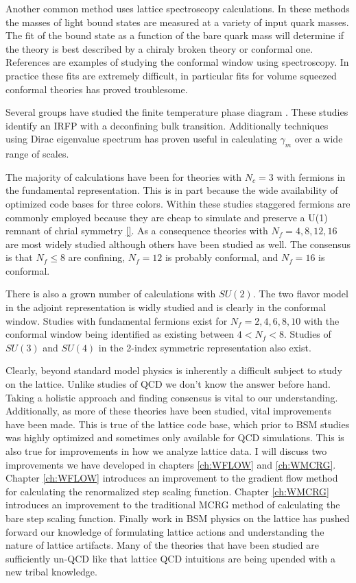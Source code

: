 Another common method uses lattice spectroscopy calculations.
In these methods the masses of light bound states are measured at a variety of input quark masses.
The fit of the bound state as a function of the bare quark mass will determine if the theory is best described by a chiraly broken theory or conformal one.
References \cite{125-127} are examples of studying the conformal window using spectroscopy.
In practice these fits are extremely difficult, in particular fits for volume squeezed conformal theories has proved troublesome.

Several groups have studied the finite temperature phase diagram \cite{131}.
These studies identify an IRFP with a deconfining bulk transition.
Additionally techniques using Dirac eigenvalue spectrum \cite{130} has proven useful in calculating $\gamma_m$ over a wide range of scales.

The majority of calculations have been for theories with $N_c=3$ with fermions in the fundamental representation.
This is in part because the wide availability of optimized code bases for three colors.
Within these studies staggered fermions are commonly employed because they are cheap to simulate and preserve a U(1) remnant of chrial symmetry \ref{}.
As a consequence theories with $N_f=4,8,12,16$ are most widely studied although others have been studied as well.
The consensus is that $N_f\le8$ are confining, $N_f=12$ is probably conformal, and $N_f=16$ is conformal.

There is also a grown number of calculations with $SU(2)$.
The two flavor model in the adjoint representation is widly studied and is clearly in the conformal window\cite{137-156}.
Studies with fundamental fermions exist for $N_f=2,4,6,8,10$ with the conformal window being identified as existing between $4<N_f<8$.
Studies of $SU(3)$ and $SU(4)$ in the 2-index symmetric representation also exist.

Clearly, beyond standard model physics is inherently a difficult subject to study on the lattice.
Unlike studies of QCD we don't know the answer before hand.
Taking a holistic approach and finding consensus is vital to our understanding.
Additionally, as more of these theories have been studied, vital improvements have been made.
This is true of the lattice code base, which prior to BSM studies was highly optimized and sometimes only available for QCD simulations.
This is also true for improvements in how we analyze lattice data.
I will discuss two improvements we have developed in chapters \ref{ch:WFLOW} and \ref{ch:WMCRG}.
Chapter \ref{ch:WFLOW} introduces an improvement to the gradient flow method for calculating the renormalized step scaling function.
Chapter \ref{ch:WMCRG} introduces an improvement to the traditional MCRG method of calculating the bare step scaling function.
Finally work in BSM physics on the lattice has pushed forward our knowledge of formulating lattice actions and understanding the nature of lattice artifacts.
Many of the theories that have been studied are sufficiently un-QCD like that lattice QCD intuitions are being upended with a new tribal knowledge.
